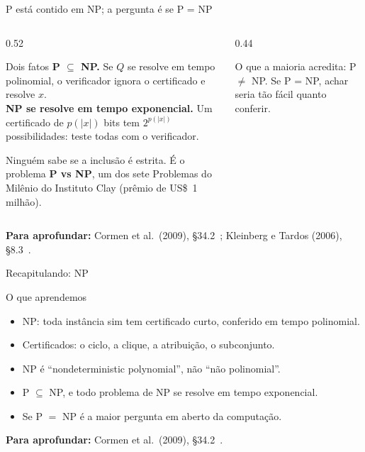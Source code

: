 \documentclass[aspectratio=169,xcolor=table]{beamer}
\newcommand{\fonte}[1]{%
  \vfill
  {\tiny\color{gray!55!black}\textbf{Para aprofundar:} #1\par}%
}
\begin{document}
\begin{frame}{P está contido em NP; a pergunta é se P = NP}
  \begin{columns}[T]
    \begin{column}{0.52\textwidth}
      \begin{block}{Dois fatos}
        \scriptsize
        \textbf{P $\subseteq$ NP.} Se $Q$ se resolve em tempo polinomial, o verificador
        ignora o certificado e resolve $x$.\\[3pt]
        \textbf{NP se resolve em tempo exponencial.} Um certificado de $p(|x|)$ bits tem
        $2^{p(|x|)}$ possibilidades: teste todas com o verificador.
      \end{block}
      \scriptsize
      Ninguém sabe se a inclusão é estrita. É o problema \textbf{P vs NP}, um dos sete
      Problemas do Milênio do Instituto Clay (prêmio de US\$~1 milhão).
    \end{column}
    \begin{column}{0.44\textwidth}
      \begin{center}
      \end{center}
      {\scriptsize O que a maioria acredita: P $\ne$ NP. Se P = NP, achar seria tão fácil
      quanto conferir.\par}
    \end{column}
  \end{columns}
  \fonte{Cormen et al.\ (2009), \S 34.2~\cite{cormen2009introduction};
    Kleinberg e Tardos (2006), \S 8.3~\cite{kleinberg2006algorithm}.}
\end{frame}

\begin{frame}{Recapitulando: NP}
  \begin{block}{O que aprendemos}
    \begin{itemize}
      \item NP: toda instância sim tem certificado curto, conferido em tempo polinomial.
      \item Certificados: o ciclo, a clique, a atribuição, o subconjunto.
      \item NP é ``nondeterministic polynomial'', não ``não polinomial''.
      \item P $\subseteq$ NP, e todo problema de NP se resolve em tempo exponencial.
      \item Se P $=$ NP é a maior pergunta em aberto da computação.
    \end{itemize}
  \end{block}
  \fonte{Cormen et al.\ (2009), \S 34.2~\cite{cormen2009introduction}.}
\end{frame}
\end{document}
